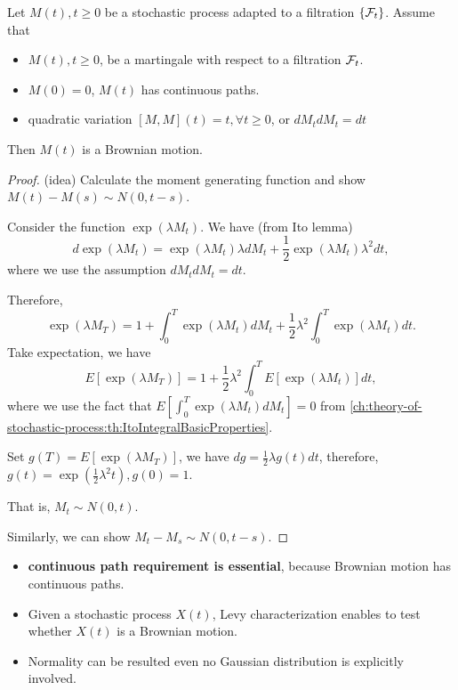 \begin{refsection}
\begin{theorem}\cite[87]{wiersema2008brownian}\cite[168]{shreve2004stochastic2}
	Let $M(t),t\geq 0$ be a stochastic process adapted to a filtration $\{\mathcal{F}_t\}$. Assume that
	\begin{itemize}
		\item $M(t),t\geq 0$, be a martingale with respect to a filtration $\mathcal{F}_t$.
		\item $M(0) = 0$, $M(t)$ has continuous paths.
		\item quadratic variation $[M,M](t) = t,\forall t\geq 0$, or $dM_t dM_t = dt$
	\end{itemize}
	Then $M(t)$ is a Brownian motion. 
\end{theorem}
\begin{proof}
	(idea) Calculate the moment generating function and show $M(t)-M(s)\sim N(0,t-s)$.
	
	Consider the function $\exp(\lambda M_t)$. We have (from Ito lemma)
	$$d \exp(\lambda M_t) = \exp(\lambda M_t)\lambda dM_t + \frac{1}{2} \exp(\lambda M_t) \lambda^2 dt,$$
	where we use the assumption $dM_tdM_t = dt$.
	
	Therefore, 
	$$\exp(\lambda M_T) = 1 + \int_0^T \exp(\lambda M_t)dM_t + \frac{1}{2} \lambda^2\int_0^T\exp(\lambda M_t)  dt.$$
	Take expectation, we have
	$$E[\exp(\lambda M_T)] = 1  + \frac{1}{2} \lambda^2\int_0^TE[\exp(\lambda M_t)]  dt,$$
	where we use the fact that $E[\int_0^T \exp(\lambda M_t)dM_t] = 0$ from \autoref{ch:theory-of-stochastic-process:th:ItoIntegralBasicProperties}. 
	
	Set $g(T) = E[\exp(\lambda M_T)] $, we have $dg = \frac{1}{2}\lambda g(t)dt$, therefore, $g(t) = \exp(\frac{1}{2}\lambda^2 t), g(0) = 1$. 
	
	That is, $M_t \sim N(0,t)$. 
	
	Similarly, we can show $M_t - M_s \sim N(0, t-s)$.
\end{proof}


\begin{remark}[implication]\hfill
	\begin{itemize}
		\item \textbf{continuous path requirement is essential}, because Brownian motion has continuous paths.
		\item Given a stochastic process $X(t)$, Levy characterization enables to test whether $X(t)$ is a Brownian motion.
		\item Normality can be resulted even no Gaussian distribution is explicitly involved.
	\end{itemize}	
\end{remark}


\end{refsection}
